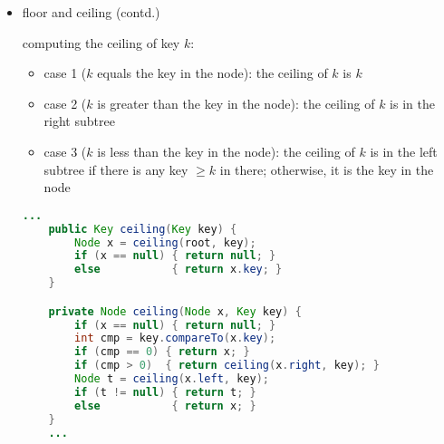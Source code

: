 \documentclass[8pt,a4paper,compress]{beamer}
\begin{document}
\begin{frame}[fragile]
\begin{itemize}
\item floor and ceiling (contd.)

\smallskip

computing the ceiling of key $k$:
\begin{itemize}
\item case 1 ($k$ equals the key in the node): the ceiling of $k$ is $k$

\item case 2 ($k$ is greater than the key in the node): the ceiling of $k$ is in the right subtree

\item case 3 ($k$ is less than the key in the node): the ceiling of $k$ is in the left subtree if there is any key $\geq k$ in there; otherwise, it is the key in the node
\end{itemize}
\begin{lstlisting}[language=Java]
    ...
    public Key ceiling(Key key) {
        Node x = ceiling(root, key);
        if (x == null) { return null; }
        else           { return x.key; }
    }

    private Node ceiling(Node x, Key key) {
        if (x == null) { return null; }
        int cmp = key.compareTo(x.key);
        if (cmp == 0) { return x; }
        if (cmp > 0)  { return ceiling(x.right, key); }
        Node t = ceiling(x.left, key); 
        if (t != null) { return t; }
        else           { return x; }
    } 
    ...
\end{lstlisting}
\end{itemize}
\end{frame}
\end{document}
